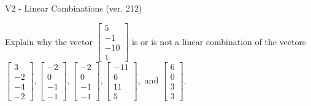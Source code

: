 \begin{exercise}
  \begin{exerciseTitle}V2 - Linear Combinations (ver. 212)\end{exerciseTitle}
  \begin{exerciseStatement}
    Explain why the vector \(\left[\begin{array}{c}
5 \\
-1 \\
-10 \\
1
\end{array}\right]\)  is or is not a linear 
	combination of the vectors \(\left[\begin{array}{c}
3 \\
-2 \\
-4 \\
-2
\end{array}\right] , \left[\begin{array}{c}
-2 \\
0 \\
-1 \\
-1
\end{array}\right] , \left[\begin{array}{c}
-2 \\
0 \\
-1 \\
-1
\end{array}\right] , \left[\begin{array}{c}
-11 \\
6 \\
11 \\
5
\end{array}\right] , \text{ and } \left[\begin{array}{c}
6 \\
0 \\
3 \\
3
\end{array}\right]\).
	



\end{exerciseStatement}
\end{exercise}
